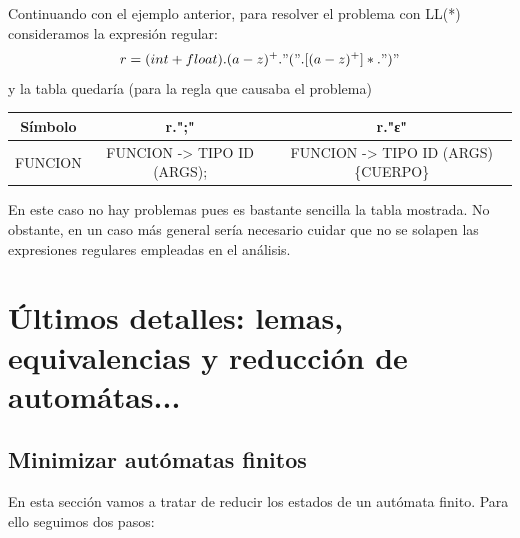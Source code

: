 \documentclass{apuntes}
\begin{document}
Continuando con el ejemplo anterior, para resolver el problema con LL(*) consideramos la expresión regular:
\[r=(int+float).(a-z)^+."(".[(a-z)^+]*.")"\]
y la tabla quedaría (para la regla que causaba el problema)
\begin{center}
\begin{tabular}{| c | c | c |}
\hline
Símbolo & r.";" & r."ε" \\
\hline
FUNCION & FUNCION -> TIPO ID (ARGS); &  FUNCION -> TIPO ID (ARGS) \{CUERPO\} \\
\hline
\end{tabular}
\end{center}
En este caso no hay problemas pues es bastante sencilla la tabla mostrada. No obstante, en un caso más general sería necesario cuidar que no se solapen las expresiones regulares empleadas en el análisis.


\section{Últimos detalles: lemas, equivalencias y reducción de automátas...}

\subsection{Minimizar autómatas finitos}
En esta sección vamos a tratar de reducir los estados de un autómata finito. Para ello seguimos dos pasos:
\end{document}
